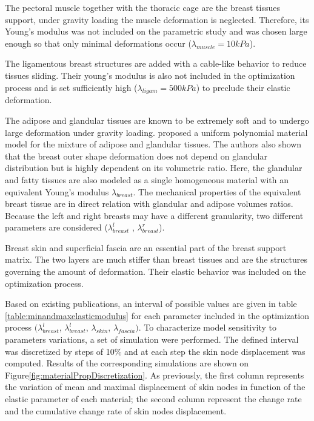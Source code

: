 The pectoral muscle together with the thoracic cage are the breast tissues support, under gravity loading the muscle deformation is neglected. Therefore, its Young's modulus was not included on the parametric study and was chosen large enough so that only minimal deformations occur ($\lambda_{muscle}=10kPa$).

The ligamentous breast structures are added with a cable-like behavior to reduce tissues sliding. Their young's modulus is also not included in the optimization process and is set sufficiently high ($\lambda_{ligam}=500kPa$) to preclude their elastic deformation. 

The adipose and glandular tissues are known to be extremely soft and to undergo large deformation under gravity loading.  \cite{calvo_polynomial_2015} proposed a uniform polynomial material model for the mixture of adipose and glandular tissues. The authors also shown that the breast outer shape deformation does not depend on glandular distribution but is highly dependent on its volumetric ratio. Here, the glandular and fatty tissues are also modeled as a single homogeneous material with an equivalent Young's modulus $\lambda_{breast }$. The mechanical properties of the equivalent breast tissue are in direct relation with glandular and adipose volumes ratios. Because the left and right breasts may have a different granularity, two different parameters are considered ($\lambda_{breast}^l$ , $\lambda_{breast}^r$).

Breast skin and superficial fascia are an essential part of the breast support matrix. The two layers are much stiffer than breast tissues and are the structures governing the amount of deformation. Their elastic behavior was included on the optimization process.

 Based on existing publications, an interval of possible values are given in table \ref{table:minandmaxelasticmodulus} for each parameter included in the optimization process $(\lambda_{breast}^l$, $\lambda_{breast}^l$, $\lambda_{skin}$, $\lambda_{fascia})$. To characterize model sensitivity to parameters variations, a set of simulation were performed. The defined interval was discretized by steps of 10\% and at each step the skin node displacement was computed. Results of the corresponding simulations are shown on Figure\ref{fig:materialPropDiscretization}. As previously, the first column represents the variation of mean and maximal displacement of skin nodes in function of the elastic parameter of each material; the second column represent the change rate and the cumulative change rate of skin nodes displacement.


